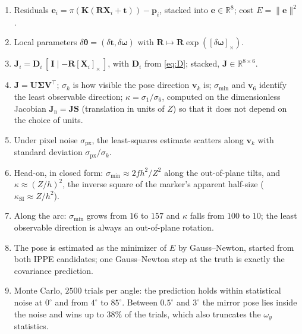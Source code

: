 \documentclass[11pt,a4paper]{article}
\theoremstyle{remark}
\newcommand{\Rset}{\mathbb{R}}
\newcommand{\Rmat}{\mathbf{R}}
\newcommand{\Jmat}{\mathbf{J}}
\newcommand{\Kmat}{\mathbf{K}}
\newcommand{\Dmat}{\mathbf{D}}
\newcommand{\Umat}{\mathbf{U}}
\newcommand{\Vmat}{\mathbf{V}}
\newcommand{\Smat}{\mathbf{S}}
\newcommand{\Sigmat}{\boldsymbol{\Sigma}}
\newcommand{\Idm}{\mathbf{I}}
\newcommand{\evec}{\mathbf{e}}
\newcommand{\pvec}{\mathbf{p}}
\newcommand{\tvec}{\mathbf{t}}
\newcommand{\vvec}{\mathbf{v}}
\newcommand{\Xvec}{\mathbf{X}}
\newcommand{\dth}{\delta\boldsymbol{\theta}}
\newcommand{\dom}{\delta\boldsymbol{\omega}}
\newcommand{\dtv}{\delta\mathbf{t}}
\newcommand{\skewm}[1]{[#1]_{\times}}
\begin{document}
\begin{enumerate}[leftmargin=*]
  \item Residuals $\evec_i = \pi(\Kmat(\Rmat\Xvec_i+\tvec)) - \pvec_i$, stacked
        into $\evec\in\Rset^8$; cost $E = \|\evec\|^2$.
  \item Local parameters $\dth = (\dtv,\dom)$ with
        $\Rmat \mapsto \Rmat\exp(\skewm{\dom})$.
  \item $\Jmat_i = \Dmat_i\,[\,\Idm \mid -\Rmat\skewm{\Xvec_i}\,]$, with
        $\Dmat_i$ from \eqref{eq:D}; stacked, $\Jmat\in\Rset^{8\times6}$.
  \item $\Jmat = \Umat\Sigmat\Vmat^{\top}$; $\sigma_k$ is how visible the pose
        direction $\vvec_k$ is; $\sigma_{\min}$ and $\vvec_6$ identify the least
        observable direction; $\kappa = \sigma_1/\sigma_6$, computed on the
        dimensionless Jacobian $\Jmat_{\mathrm{n}} = \Jmat\Smat$ (translation in
        units of $Z$) so that it does not depend on the choice of units.
  \item Under pixel noise $\sigma_{\mathrm{px}}$, the least-squares estimate
        scatters along $\vvec_k$ with standard deviation
        $\sigma_{\mathrm{px}}/\sigma_k$.
  \item Head-on, in closed form: $\sigma_{\min} \approx 2fh^2/Z^2$ along the
        out-of-plane tilts, and $\kappa \approx (Z/h)^2$, the inverse square of
        the marker's apparent half-size ($\kappa_{\mathrm{SI}} \approx Z/h^2$).
  \item Along the arc: $\sigma_{\min}$ grows from $16$ to $157$ and $\kappa$ falls
        from $100$ to $10$; the least observable direction is always an
        out-of-plane rotation.
  \item The pose is estimated as the minimizer of $E$ by Gauss--Newton,
        started from both IPPE candidates; one Gauss--Newton step at the truth
        is exactly the covariance prediction.
  \item Monte Carlo, $2500$ trials per angle: the prediction holds within
        statistical noise at $0^{\circ}$ and from $4^{\circ}$ to $85^{\circ}$.
        Between $0.5^{\circ}$ and $3^{\circ}$ the mirror pose lies inside the
        noise and wins up to $38\%$ of the trials, which also truncates the
        $\omega_y$ statistics.
\end{enumerate}
\end{document}

